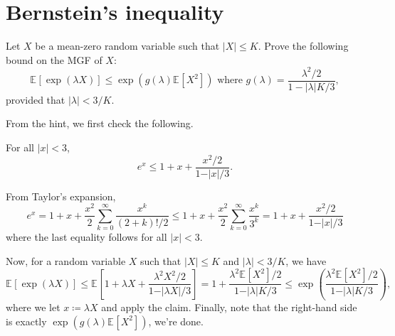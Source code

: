 \section{Bernstein's inequality}
\begin{problem*}[Exercise 2.8.5]\label{ex2.8.5}
	Let \(X\) be a mean-zero random variable such that \(\lvert X \rvert \leq K\). Prove the following bound on the MGF of \(X\):
	\[
		\mathbb{E}_{}[\exp (\lambda X)]
		\leq \exp (g(\lambda ) \mathbb{E}_{}[X^2] )
		\text{ where } g(\lambda ) = \frac{\lambda ^2 / 2}{1 - \lvert \lambda \rvert K / 3},
	\]
	provided that \(\lvert \lambda \rvert < 3 / K\).
\end{problem*}
\begin{answer}
	From the hint, we first check the following.

	\begin{claim}
		For all \(\vert x \vert < 3\),
		\[
			e^x \leq 1 + x + \frac{x^2 / 2}{1 - \vert x \vert / 3}.
		\]
	\end{claim}
	\begin{explanation}
		From Taylor's expansion,
		\[
			e^x
			= 1 + x + \frac{x^2}{2} \sum_{k=0}^{\infty} \frac{x^k}{(2 + k)! / 2}
			\leq 1 + x + \frac{x^2}{2} \sum_{k=0}^{\infty} \frac{x^k}{3^k}
			= 1 + x + \frac{x^2 / 2}{1 - \vert x \vert / 3}
		\]
		where the last equality follows for all \(\vert x \vert < 3\).
	\end{explanation}

	Now, for a random variable \(X\) such that \(\vert X \vert \leq K\) and \(\vert \lambda \vert < 3 / K\), we have
	\[
		\mathbb{E}_{}[\exp (\lambda X)]
		\leq \mathbb{E}_{}\left[1 + \lambda X + \frac{\lambda ^2 X^2 / 2}{1 - \vert \lambda X \vert / 3}\right]
		= 1 + \frac{\lambda ^2 \mathbb{E}_{}[X^2] / 2}{1 - \vert \lambda \vert K / 3}
		\leq \exp (\frac{\lambda ^2 \mathbb{E}_{}[X^2] / 2}{1 - \vert \lambda \vert K / 3}),
	\]
	where we let \(x \coloneqq \lambda X\) and apply the claim. Finally, note that the right-hand side is exactly \(\exp (g(\lambda ) \mathbb{E}_{}[X^2] )\), we're done.
\end{answer}

